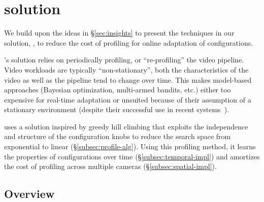 \section{\name solution}
\label{sec:algorithm}
We build upon the ideas in \S\ref{sec:insights} to present the techniques in our solution, \name, to reduce  the cost of profiling for online adaptation of configurations.%

{\name}'s solution relies on periodically profiling, or ``re-profiling'' the video pipeline. Video workloads are typically ``non-stationary'', \ie both the characteristics of the video as well as the pipeline tend to change over time. This makes model-based approaches (\eg Bayesian optimization, multi-armed bandits, etc.) either too expensive for real-time adaptation or unsuited because of their assumption of a stationary environment (despite their successful use in recent systems~\cite{ernest,cherrypick,amazon-bandit}).


\name uses a solution inspired by greedy hill climbing that exploits the independence and structure of the \nn configuration knobs to reduce the search space from exponential to linear (\S\ref{subsec:profile-alg}). Using this profiling method, it learns the properties of configurations over time (\S\ref{subsec:temporal-impl}) and amortizes the cost of profiling across multiple cameras (\S\ref{subsec:spatial-impl}). 

\subsection{Overview}

